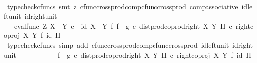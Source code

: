 \begin{isabellebody}
\ \ \ \ \ \ \ \ \isamarkupfalse%
\ {\isacharparenleft}{\kern0pt}typecheck{\isacharunderscore}{\kern0pt}cfuncs{\isacharcomma}{\kern0pt}\ smt\ {\isacharparenleft}{\kern0pt}z{}{\isacharparenright}{\kern0pt}\ cfunc{\isacharunderscore}{\kern0pt}cross{\isacharunderscore}{\kern0pt}prod{\isacharunderscore}{\kern0pt}comp{\isacharunderscore}{\kern0pt}cfunc{\isacharunderscore}{\kern0pt}cross{\isacharunderscore}{\kern0pt}prod\ comp{\isacharunderscore}{\kern0pt}associative{}\ id{\isacharunderscore}{\kern0pt}left{\isacharunderscore}{\kern0pt}unit{}\ id{\isacharunderscore}{\kern0pt}right{\isacharunderscore}{\kern0pt}unit{}{\isacharparenright}{\kern0pt}\isanewline
\ \ \ \ \ \ \isamarkupfalse%
\ \isamarkupfalse%
\ {\isachardoublequoteopen}{\isachardot}{\kern0pt}{\isachardot}{\kern0pt}{\isachardot}{\kern0pt}\ {\isacharequal}{\kern0pt}\ {\isacharparenleft}{\kern0pt}eval{\isacharunderscore}{\kern0pt}func\ Z\ {\isacharparenleft}{\kern0pt}X\ {\isasymCoprod}\ Y{\isacharparenright}{\kern0pt}\ {\isasymcirc}\isactrlsub c\ \ {\isacharparenleft}{\kern0pt}id\ {\isacharparenleft}{\kern0pt}X\ {\isasymCoprod}\ Y{\isacharparenright}{\kern0pt}\ {\isasymtimes}\isactrlsub f\ {\isacharparenleft}{\kern0pt}f\isactrlsup {\isasymflat}\ {\isasymamalg}\ g\isactrlsup {\isasymflat}\ {\isasymcirc}\isactrlsub c\ dist{\isacharunderscore}{\kern0pt}prod{\isacharunderscore}{\kern0pt}coprod{\isacharunderscore}{\kern0pt}right\ X\ Y\ H{\isacharparenright}{\kern0pt}\isactrlsup {\isasymsharp}{\isacharparenright}{\kern0pt}\ {\isasymcirc}\isactrlsub c\ {\isacharparenleft}{\kern0pt}right{\isacharunderscore}{\kern0pt}coproj\ X\ Y\ {\isasymtimes}\isactrlsub f\ id\ H{\isacharparenright}{\kern0pt}{\isacharparenright}{\kern0pt}\isactrlsup {\isasymsharp}{\isachardoublequoteclose}\isanewline
\ \ \ \ \ \ \ \ \isamarkupfalse%
\ {\isacharparenleft}{\kern0pt}typecheck{\isacharunderscore}{\kern0pt}cfuncs{\isacharcomma}{\kern0pt}\ simp\ add{\isacharcolon}{\kern0pt}\ cfunc{\isacharunderscore}{\kern0pt}cross{\isacharunderscore}{\kern0pt}prod{\isacharunderscore}{\kern0pt}comp{\isacharunderscore}{\kern0pt}cfunc{\isacharunderscore}{\kern0pt}cross{\isacharunderscore}{\kern0pt}prod\ id{\isacharunderscore}{\kern0pt}left{\isacharunderscore}{\kern0pt}unit{}\ id{\isacharunderscore}{\kern0pt}right{\isacharunderscore}{\kern0pt}unit{}{\isacharparenright}{\kern0pt}\isanewline
\ \ \ \ \ \ \isamarkupfalse%
\ \isamarkupfalse%
\ {\isachardoublequoteopen}{\isachardot}{\kern0pt}{\isachardot}{\kern0pt}{\isachardot}{\kern0pt}\ {\isacharequal}{\kern0pt}\ {\isacharparenleft}{\kern0pt}f\isactrlsup {\isasymflat}\ {\isasymamalg}\ g\isactrlsup {\isasymflat}\ {\isasymcirc}\isactrlsub c\ {\isacharparenleft}{\kern0pt}dist{\isacharunderscore}{\kern0pt}prod{\isacharunderscore}{\kern0pt}coprod{\isacharunderscore}{\kern0pt}right\ X\ Y\ H\ {\isasymcirc}\isactrlsub c\ right{\isacharunderscore}{\kern0pt}coproj\ X\ Y\ {\isasymtimes}\isactrlsub f\ id\ H{\isacharparenright}{\kern0pt}{\isacharparenright}{\kern0pt}\isactrlsup {\isasymsharp}{\isachardoublequoteclose}\isanewline

\end{isabellebody}
